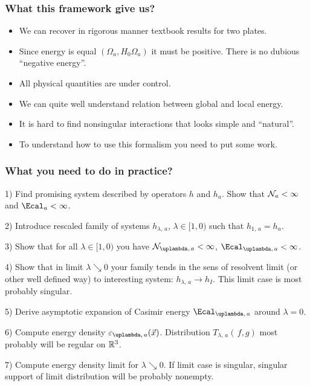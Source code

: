 \documentclass[10pt,t]{beamer}
\begin{document}
\begin{frame}
  \frametitle{What this framework give us?}


  \begin{itemize}

  \item We can recover in rigorous manner textbook results for two
    plates.

  \item Since energy is equal $( \Omega_{ a }, H_{ 0 } \Omega_{ a } )$
    it must be positive. There is no dubious ``negative energy''.

  \item All physical quantities are under control.

  \item We can quite well understand relation between global and local
    energy.

  \item It is hard to find nonsingular interactions that looks simple
    and ``natural''.

  \item To understand how to use this formalism you need to put some
    work.

  \end{itemize}

\end{frame}





\begin{frame}
  \frametitle{What you need to do in practice?}


  1) Find promising system described by operators $h$ and $h_{ a }$.
  Show that $\mathcal{N}_{ a } < \infty$ and $\Ecal_{ a } < \infty$.

  2) Introduce rescaled family of systems $h_{ \lambda,\, a }$,
  $\lambda \in [ 1, 0 )$ such that $h_{ 1,\, a } = h_{ a }$.

  3) Show that for all $\lambda \in [ 1, 0 )$ you have
  $\Ncal_{ \lambda,\, a } < \infty$,
  $\Ecal_{ \lambda,\, a } < \infty$.

  4) Show that in limit $\lambda \searrow 0$ your family tends in the
  sens of resolvent limit (or other well defined way) to interesting
  system: $h_{ \lambda,\, a } \to h_{ I }$. This limit case is most
  probably singular.

  5) Derive asymptotic expansion of Casimir energy
  $\Ecal_{ \lambda,\, a }$ around $\lambda = 0$.

  6) Compute energy density $\varepsilon_{ \lambda,\, a }( \vecx )$.
  Distribution $T_{ \lambda,\, a }( \, f, g )$ most probably will be
  regular on $\mathbb{R}^{ 3 }$.

  7) Compute energy density limit for $\lambda \searrow 0$. If limit
  case is singular, singular support of limit distribution will be
  probably nonempty.

\end{frame}
\end{document}
